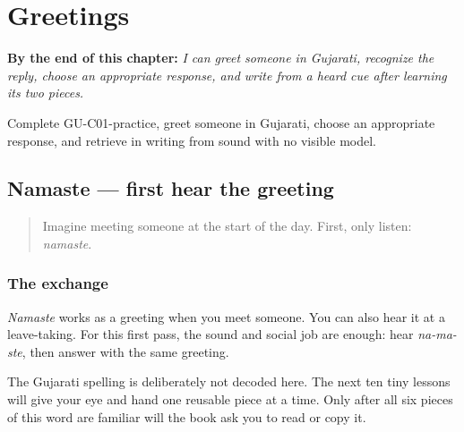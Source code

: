 
\chapter{Greetings}
\label{ch:greetings}

\begin{chapteropening}
\textbf{By the end of this chapter:} \emph{I can greet someone in Gujarati, recognize the reply, choose an appropriate response, and write  from a heard cue after learning its two pieces.}

Complete GU-C01-practice, greet someone in Gujarati, choose an appropriate response, and retrieve  in writing from sound with no visible model.
\end{chapteropening}

\section[namaste]{Namaste — first hear the greeting}

\label{lesson:GU-C01-namaste}



\begin{quote}
Imagine meeting someone at the start of the day. First, only listen: \emph{namaste}.
\end{quote}

\subsection*{The exchange}
\emph{Namaste} works as a greeting when you meet someone. You can also hear it at a leave-taking. For this first pass, the sound and social job are enough: hear \emph{na-ma-ste}, then answer with the same greeting.

The Gujarati spelling is deliberately not decoded here. The next ten tiny lessons will give your eye and hand one reusable piece at a time. Only after all six pieces of this word are familiar will the book ask you to read or copy it.

